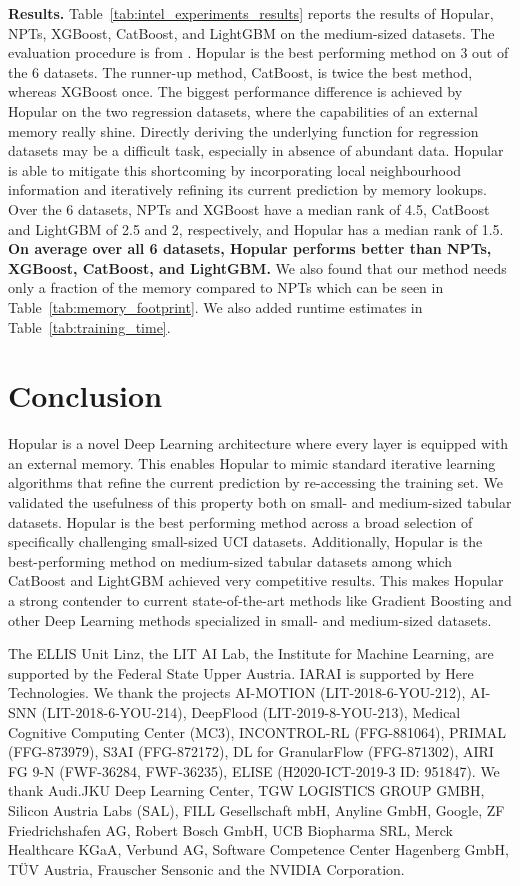 \documentclass{article}
\theoremstyle{plain}
\theoremstyle{definition}
\theoremstyle{remark}
\begin{document}
\textbf{Results.} Table~\ref{tab:intel_experiments_results} reports the results
of Hopular, NPTs, XGBoost, CatBoost, and LightGBM on the medium-sized datasets.
The evaluation procedure is from \citep{ShwartzZiv:21}.
Hopular is the best performing method on 3 out of the 6 datasets.
The runner-up method, CatBoost, is twice the best method, whereas XGBoost once.
The biggest performance difference is achieved by Hopular on the two regression datasets,
where the capabilities of an external memory really shine.
Directly deriving the underlying function for regression datasets may be a difficult task,
especially in absence of abundant data.
Hopular is able to mitigate this shortcoming
by incorporating local neighbourhood information and
iteratively refining its current prediction by memory lookups.
Over the 6 datasets, NPTs and XGBoost have a median rank of 4.5,
CatBoost and LightGBM of 2.5 and 2, respectively,
and Hopular has a median rank of 1.5.
{\bf On average over all 6 datasets, Hopular performs better than 
NPTs, XGBoost, CatBoost, and LightGBM.}
We also found that our method needs only a fraction of the memory compared to NPTs which can be seen in Table~\ref{tab:memory_footprint}. We also added runtime estimates in Table~\ref{tab:training_time}.

\section{Conclusion}
Hopular is a novel Deep Learning architecture where every layer is equipped
with an external memory. This enables Hopular to mimic standard iterative learning
algorithms that refine the current prediction by re-accessing the training set.
We validated the usefulness of this property both on small- and
medium-sized tabular datasets. Hopular is the best performing method
across a broad selection of specifically challenging small-sized UCI
datasets. Additionally, Hopular is the best-performing method on
medium-sized tabular datasets among which CatBoost and LightGBM achieved very competitive
results.
This makes Hopular a strong contender to current state-of-the-art methods like Gradient Boosting and other Deep Learning methods specialized in small- and medium-sized datasets.

\begin{ack}
The ELLIS Unit Linz, the LIT AI Lab, the Institute for Machine Learning, are supported by the Federal State Upper Austria. IARAI is supported by Here Technologies. We thank the projects AI-MOTION (LIT-2018-6-YOU-212), AI-SNN (LIT-2018-6-YOU-214), DeepFlood (LIT-2019-8-YOU-213), Medical Cognitive Computing Center (MC3), INCONTROL-RL (FFG-881064), PRIMAL (FFG-873979), S3AI (FFG-872172), DL for GranularFlow (FFG-871302), AIRI FG 9-N (FWF-36284, FWF-36235), ELISE (H2020-ICT-2019-3 ID: 951847). We thank Audi.JKU Deep Learning Center, TGW LOGISTICS GROUP GMBH, Silicon Austria Labs (SAL), FILL Gesellschaft mbH, Anyline GmbH, Google, ZF Friedrichshafen AG, Robert Bosch GmbH, UCB Biopharma SRL, Merck Healthcare KGaA, Verbund AG, Software Competence Center Hagenberg GmbH, T\"{U}V Austria, Frauscher Sensonic and the NVIDIA Corporation.
\end{ack}
\end{document}
